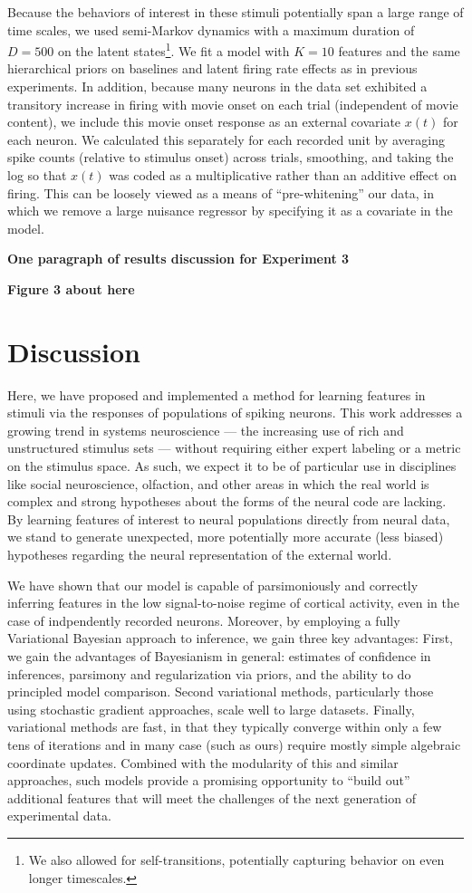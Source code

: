 \documentclass{article} %
\begin{document}
Because the behaviors of interest in these stimuli potentially span a large range of time scales, we used semi-Markov dynamics with a maximum duration of $D = 500$ on the latent states\footnote{We also allowed for self-transitions, potentially capturing behavior on even longer timescales.}. We fit a model with $K=10$ features and the same hierarchical priors on baselines and latent firing rate effects as in previous experiments. In addition, because many neurons in the data set exhibited a transitory increase in firing with movie onset on each trial (independent of movie content), we include this movie onset response as an external covariate $x(t)$ for each neuron. We calculated this separately for each recorded unit by averaging spike counts (relative to stimulus onset) across trials, smoothing, and taking the log so that $x(t)$ was coded as a multiplicative rather than an additive effect on firing. This can be loosely viewed as a means of ``pre-whitening'' our data, in which we remove a large nuisance regressor by specifying it as a covariate in the model.

\textbf{One paragraph of results discussion for Experiment 3}

\textbf{Figure 3 about here}

\section{Discussion}
Here, we have proposed and implemented a method for learning features in stimuli via the responses of populations of spiking neurons. This work addresses a growing trend in systems neuroscience --- the increasing use of rich and unstructured stimulus sets --- without requiring either expert labeling or a metric on the stimulus space. As such, we expect it to be of particular use in disciplines like social neuroscience, olfaction, and other areas in which the real world is complex and strong hypotheses about the forms of the neural code are lacking. By learning features of interest to neural populations directly from neural data, we stand to generate unexpected, more potentially more accurate (less biased) hypotheses regarding the neural representation of the external world.  

We have shown that our model is capable of parsimoniously and correctly inferring features in the low signal-to-noise regime of cortical activity, even in the case of indpendently recorded neurons. Moreover, by employing a fully Variational Bayesian approach to inference, we gain three key advantages: First, we gain the advantages of Bayesianism in general: estimates of confidence in inferences, parsimony and regularization via priors, and the ability to do principled model comparison. Second variational methods, particularly those using stochastic gradient approaches, scale well to large datasets. Finally, variational methods are fast, in that they typically converge within only a few tens of iterations and in many case (such as ours) require mostly simple algebraic coordinate updates. Combined with the modularity of this and similar approaches, such models provide a promising opportunity to ``build out'' additional features that will meet the challenges of the next generation of experimental data.
\end{document}
